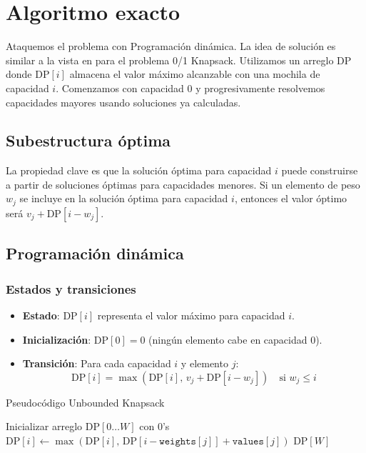 \documentclass{report}
\begin{document}
\section{Algoritmo exacto}

Ataquemos el problema con Programación dinámica. La idea de solución es similar a la vista en \cite{CLRS2009} para el problema 0/1 Knapsack.
Utilizamos un arreglo $\text{DP}$ donde $\text{DP}[i]$ almacena el valor máximo alcanzable con una mochila de capacidad $i$. Comenzamos con capacidad 0 y progresivamente resolvemos capacidades mayores usando soluciones ya calculadas.

\subsection*{Subestructura óptima}
La propiedad clave es que la solución óptima para capacidad $i$ puede construirse a partir de soluciones óptimas para capacidades menores. Si un elemento de peso $w_j$ se incluye en la solución óptima para capacidad $i$, entonces el valor óptimo será $v_j + \text{DP}[i - w_j]$.

\subsection{Programación dinámica}
\subsubsection*{Estados y transiciones}
\begin{itemize}
    \item \textbf{Estado}: $\text{DP}[i]$ representa el valor máximo para capacidad $i$.
    \item \textbf{Inicialización}: $\text{DP}[0] = 0$ (ningún elemento cabe en capacidad 0).
    \item \textbf{Transición}: Para cada capacidad $i$ y elemento $j$:
        \[
        \text{DP}[i] = \max\left(\text{DP}[i],\, v_j + \text{DP}[i - w_j]\right) \quad \text{si } w_j \leq i
        \]
\end{itemize}

\begin{algorithm}[H]
	\caption{Pseudocódigo Unbounded Knapsack}
    \State Inicializar arreglo $\text{DP}[0 \dots W]$ con 0's
                \State $\text{DP}[i] \gets \max(\text{DP}[i],\, \text{DP}[i - \texttt{weights}[j]] + \texttt{values}[j])$
            \EndIf
        \EndFor
    \EndFor
    \State \Return $\text{DP}[W]$
\EndProcedure
\end{algorithm}
\end{document}
